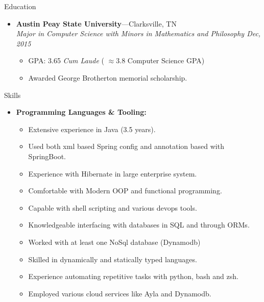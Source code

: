 \documentclass[11pt,oneside]{article}
\newenvironment{ressection}[1]{
	\vspace{4pt}
	{\fontfamily{phv}\selectfont\Large#1}
	\begin{itemize}
	\vspace{3pt}
}{
	\end{itemize}
}
\newcommand{\resitem}[1]{
	\vspace{-4pt}
	\item \begin{flushleft} #1 \end{flushleft}
}
\newcommand{\ressubitem}[1]{
	\vspace{-1pt}
	\item \begin{flushleft} #1 \end{flushleft}
}
\newcommand{\resbigitem}[3]{
	\vspace{-5pt}
	\item
	\textbf{#1}---#2 \\
	\textit{#3}
}
\newenvironment{ressubsec}[3]{
	\resbigitem{#1}{#2}{#3}
	\vspace{-2pt}
	\begin{itemize}
}{
	\end{itemize}
}
\newenvironment{reslist}[1]{
	\resitem{\textbf{#1}}
	\vspace{-5pt}
	\begin{itemize}
}{
	\end{itemize}
}
\begin{document}
\begin{ressection}{Education}

	\begin{ressubsec}{Austin Peay State University}{Clarksville, TN}{Major in Computer Science with Minors in Mathematics and Philosophy Dec, 2015}
		\ressubitem{GPA: 3.65 \textit{Cum Laude} ( $\approx 3.8$ Computer Science GPA)}
		\ressubitem{Awarded George Brotherton memorial scholarship.}
	\end{ressubsec}
\end{ressection}

\begin{ressection}{Skills}
	\begin{reslist}{Programming Languages \& Tooling:}
        \ressubitem{Extensive experience in Java (3.5 years).}
        \ressubitem{Used both xml based Spring config and annotation based with SpringBoot.}
        \ressubitem{Experience with Hibernate in large enterprise system.}
		\ressubitem{Comfortable with Modern OOP and functional programming.}
		\ressubitem{Capable with shell scripting and various devops tools.}
		\ressubitem{Knowledgeable interfacing with databases in SQL and through ORMs.}
        \ressubitem{Worked with at least one NoSql database (Dynamodb)}
		\ressubitem{Skilled in dynamically and statically typed languages. }
		\ressubitem{Experience automating repetitive tasks with python, bash and zsh.}
		\ressubitem{Employed various cloud services like Ayla and Dynamodb.}
\end{reslist}
\end{ressection}
\end{document}
